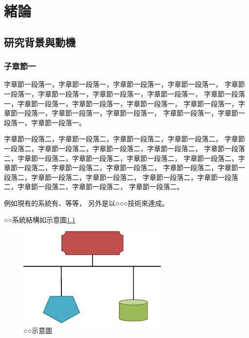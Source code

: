 \chapter{緒論}
\label{chapter:intro}
\section{研究背景與動機}
\label{sec:background}
    \subsection{子章節一}
        字章節一段落一，字章節一段落一，字章節一段落一，字章節一段落一，
        字章節一段落一，字章節一段落一，字章節一段落一，字章節一段落一，
        字章節一段落一，字章節一段落一，字章節一段落一，字章節一段落一，
        字章節一段落一，字章節一段落一，字章節一段落一，字章節一段落一，
        字章節一段落一，字章節一段落一，字章節一段落一。

        字章節一段落二，字章節一段落二，字章節一段落二，字章節一段落二，
        字章節一段落二，字章節一段落二，字章節一段落二，字章節一段落二，
        字章節一段落二，字章節一段落二，字章節一段落二，字章節一段落二，
        字章節一段落二，字章節一段落二，字章節一段落二，字章節一段落二，
        字章節一段落二，字章節一段落二，字章節一段落二，字章節一段落二，
        字章節一段落二，字章節一段落二，字章節一段落二，字章節一段落二，
        字章節一段落二。

        例如現有的系統有\cite{GoogleComputeEngine}、\cite{AmazonEC2}等等，
        另外\cite{GoogleApps}是以○○○技術來達成。

        ○○系統結構如示意圖\ref{fig:this_system}
        \begin{figure}[htbp]
            \centerline{\includegraphics[height=5cm]{graphs/introduction/this_system.eps}}
            \caption{○○示意圖}
            \label{fig:this_system}
        \end{figure}

